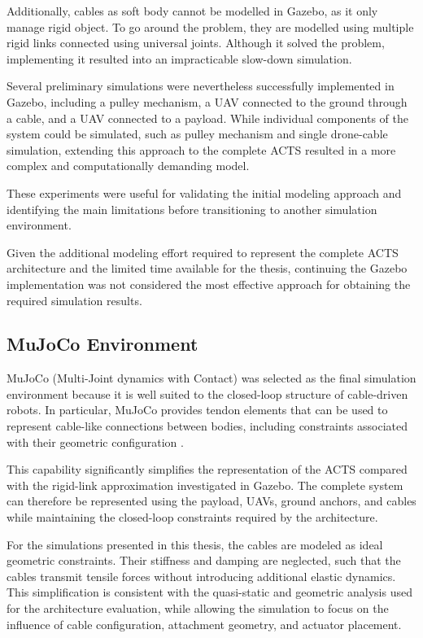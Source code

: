 Additionally, cables as soft body cannot be modelled in Gazebo, as it only manage rigid object. To go around the problem, they are modelled using multiple rigid links connected using universal joints. Although it solved the problem, implementing it resulted into an impracticable slow-down simulation.

Several preliminary simulations were nevertheless successfully implemented in Gazebo, including a pulley mechanism, a UAV connected to the ground through a cable, and a UAV connected to a payload. While individual components of the system could be simulated, such as pulley mechanism and single drone-cable simulation, extending this approach to the complete ACTS resulted in a more complex and computationally demanding model.

These experiments were useful for validating the initial modeling approach and identifying the main limitations before transitioning to another simulation environment.


Given the additional modeling effort required to represent the complete ACTS architecture and the limited time available for the thesis, continuing the Gazebo implementation was not considered the most effective approach for obtaining the required simulation results.

\subsection{MuJoCo Environment}

MuJoCo (Multi-Joint dynamics with Contact) was selected as the final simulation environment because it is well suited to the closed-loop structure of cable-driven robots. In particular, MuJoCo provides tendon elements that can be used to represent cable-like connections between bodies, including constraints associated with their geometric configuration \cite{mujoco_docs_237}.

This capability significantly simplifies the representation of the ACTS compared with the rigid-link approximation investigated in Gazebo. The complete system can therefore be represented using the payload, UAVs, ground anchors, and cables while maintaining the closed-loop constraints required by the architecture.

For the simulations presented in this thesis, the cables are modeled as ideal geometric constraints. Their stiffness and damping are neglected, such that the cables transmit tensile forces without introducing additional elastic dynamics. This simplification is consistent with the quasi-static and geometric analysis used for the architecture evaluation, while allowing the simulation to focus on the influence of cable configuration, attachment geometry, and actuator placement.

